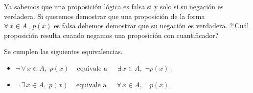 Ya sabemos que una proposici\'on l\'ogica es falsa si y solo si su negaci\'on
es verdadera. Si queremos demostrar que una proposici\'on de 
la forma $\forall\, x \in A\,,\, p(x)$ es falsa debemos demostrar
que su negaci\'on es verdadera. ?`Cu\'al proposici\'on resulta cuando
negamos una proposici\'on con cuantificador?

\begin{prop}
Se cumplen las siguientes equivalencias.
\begin{itemize}
\item
$ 
\neg \,\forall\,x\in A,\,\,p(x)\,\quad\textrm{equivale a }
\quad\,\exists\,x\in A,\,\,
\neg p(x)\,$.
\item
$ 
\neg \,\exists\,x\in A,\,\,p(x)\,\quad\textrm{equivale a }
\quad\,\forall\,x\in A,\,\,
\neg p(x)\,$.
\end{itemize}


\end{prop}

\medskip 

